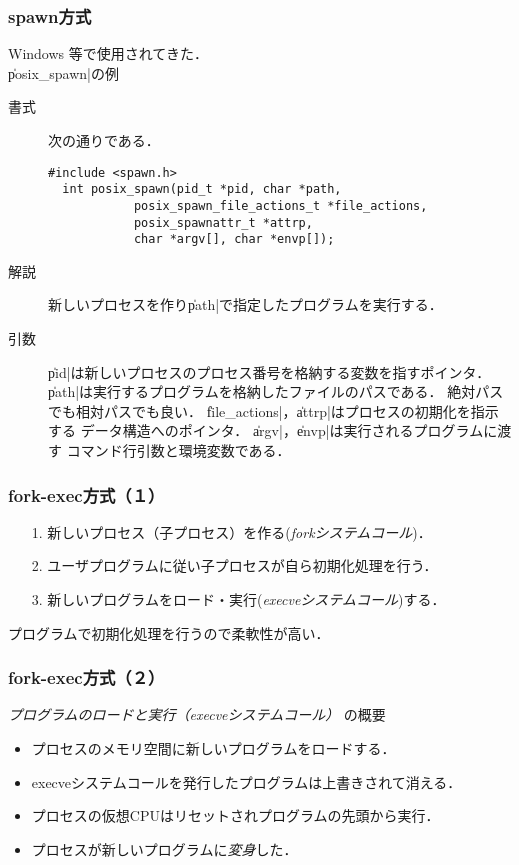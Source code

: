 \documentclass{beamer}                 %
\begin{document}
\begin{frame}[fragile]
  \frametitle{spawn方式}
  Windows 等で使用されてきた．\\
  \|posix_spawn|の例 \\
  \begin{description}
  \item[書式] 次の通りである．
\begin{lstlisting}[numbers=none]
  #include <spawn.h>
  int posix_spawn(pid_t *pid, char *path,
            posix_spawn_file_actions_t *file_actions,
            posix_spawnattr_t *attrp,
            char *argv[], char *envp[]);
\end{lstlisting}

  \item[解説]
    新しいプロセスを作り\|path|で指定したプログラムを実行する．

  \item[引数]
    \|pid|は新しいプロセスのプロセス番号を格納する変数を指すポインタ．
    \|path|は実行するプログラムを格納したファイルのパスである．
    絶対パスでも相対パスでも良い．
    \|file_actions|，\|attrp|はプロセスの初期化を指示する
    データ構造へのポインタ．
    \|argv|，\|envp|は実行されるプログラムに渡す
    コマンド行引数と環境変数である．
  \end{description}
\end{frame}

\begin{frame}[fragile]
  \frametitle{fork-exec方式（１）}
  \begin{enumerate}
  \item[1.] 新しいプロセス（子プロセス）を作る(\emph{forkシステムコール})．
  \item[2.] ユーザプログラムに従い子プロセスが自ら初期化処理を行う．
  \item[3.] 新しいプログラムをロード・実行(\emph{execveシステムコール})する．
  \end{enumerate}
  プログラムで初期化処理を行うので柔軟性が高い．
  \vfill
\end{frame}

\begin{frame}[fragile]
  \frametitle{fork-exec方式（２）}
  \emph{プログラムのロードと実行（execveシステムコール）} の概要\\
  \begin{itemize}
  \item プロセスのメモリ空間に新しいプログラムをロードする．
  \item execveシステムコールを発行したプログラムは上書きされて消える．
  \item プロセスの仮想CPUはリセットされプログラムの先頭から実行．
  \item プロセスが新しいプログラムに\emph{変身}した．
  \end{itemize}
\end{frame}
\end{document}
